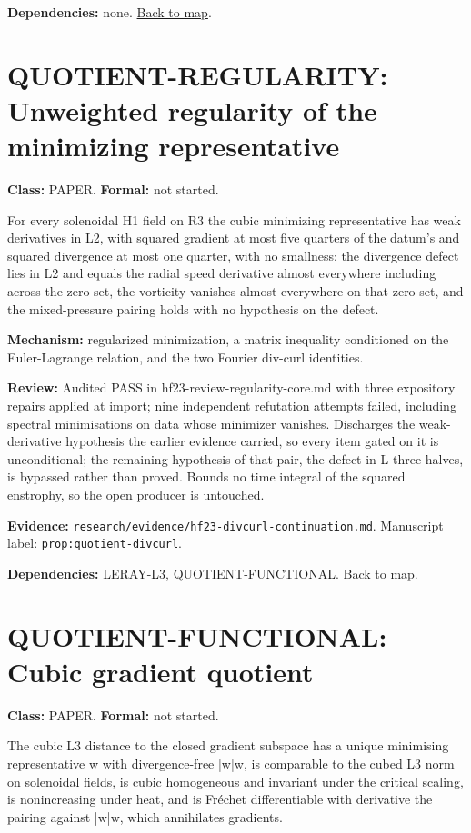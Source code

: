 \documentclass[10pt]{article}
\begin{document}
\textbf{Dependencies:} none. \hyperref[map]{Back to map}.

\section*{QUOTIENT-REGULARITY: Unweighted regularity of the minimizing representative}\label{node:QUOTIENT-REGULARITY}
\textbf{Class:} PAPER. \textbf{Formal:} not started.

For every solenoidal H1 field on R3 the cubic minimizing representative has weak derivatives in L2, with squared gradient at most five quarters of the datum's and squared divergence at most one quarter, with no smallness; the divergence defect lies in L2 and equals the radial speed derivative almost everywhere including across the zero set, the vorticity vanishes almost everywhere on that zero set, and the mixed-pressure pairing holds with no hypothesis on the defect.

\textbf{Mechanism:} regularized minimization, a matrix inequality conditioned on the Euler-Lagrange relation, and the two Fourier div-curl identities.

\textbf{Review:} Audited PASS in hf23-review-regularity-core.md with three expository repairs applied at import; nine independent refutation attempts failed, including spectral minimisations on data whose minimizer vanishes. Discharges the weak-derivative hypothesis the earlier evidence carried, so every item gated on it is unconditional; the remaining hypothesis of that pair, the defect in L three halves, is bypassed rather than proved. Bounds no time integral of the squared enstrophy, so the open producer is untouched.

\textbf{Evidence:} \texttt{research/evidence/hf23-divcurl-continuation.md}. Manuscript label: \texttt{prop:quotient-divcurl}.

\textbf{Dependencies:} \hyperref[node:LERAY-L3]{LERAY-L3}, \hyperref[node:QUOTIENT-FUNCTIONAL]{QUOTIENT-FUNCTIONAL}. \hyperref[map]{Back to map}.

\section*{QUOTIENT-FUNCTIONAL: Cubic gradient quotient}\label{node:QUOTIENT-FUNCTIONAL}
\textbf{Class:} PAPER. \textbf{Formal:} not started.

The cubic L3 distance to the closed gradient subspace has a unique minimising representative w with divergence-free |w|w, is comparable to the cubed L3 norm on solenoidal fields, is cubic homogeneous and invariant under the critical scaling, is nonincreasing under heat, and is Fréchet differentiable with derivative the pairing against |w|w, which annihilates gradients.
\end{document}
